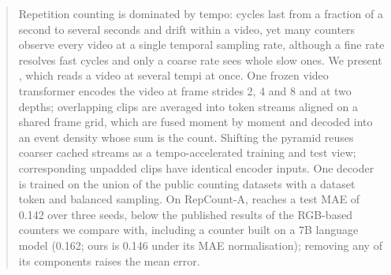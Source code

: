 \begin{abstract}
Repetition counting is dominated by tempo: cycles last from a fraction of a second
to several seconds and drift within a video, yet many counters observe every
video at a single temporal sampling rate, although a fine rate resolves fast cycles
and only a coarse rate sees whole slow ones. We present \method, which reads a video at several tempi at once.
One frozen video transformer encodes the video at frame strides 2, 4 and 8 and at
two depths; overlapping clips are averaged into token streams aligned on a shared
frame grid, which are fused moment by moment and decoded into an event density
whose sum is the count. Shifting the pyramid reuses coarser cached streams as a
tempo-accelerated training and test view; corresponding unpadded clips have
identical encoder inputs. One decoder is trained
on the union of the public counting datasets with a dataset token and balanced
sampling. On RepCount-A, \method reaches a test MAE of 0.142 over three seeds,
below the published results of the RGB-based counters we compare with, including
a counter built on a 7B language model (0.162; ours is 0.146 under its MAE
normalisation); removing any of its components raises the mean error.
\end{abstract}
